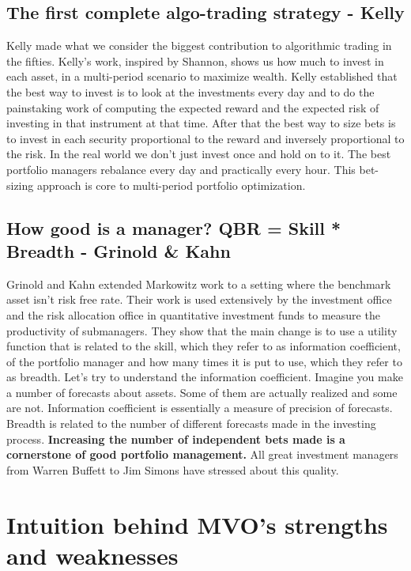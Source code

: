 \documentclass[a4paper]{article}
\begin{document}
\subsection{The first complete algo-trading strategy - Kelly}
Kelly\cite{Kelly90} made what we consider the biggest contribution to algorithmic trading in the fifties. Kelly’s work, inspired by Shannon, shows us how much to invest in each asset, in a multi-period scenario to maximize wealth. Kelly established that the best way to invest is to look at the investments every day and to do the painstaking work of computing the expected reward and the expected risk of investing in that instrument at that time. After that the best way to size bets is to invest in each security proportional to the reward and inversely proportional to the risk. In the real world we don't just invest once and hold on to it. The best portfolio managers rebalance every day and practically every hour. This bet-sizing approach is core to multi-period portfolio optimization. 

\subsection{How good is a manager? QBR = Skill * Breadth - Grinold \& Kahn}
Grinold and Kahn\cite{GK2000} extended Markowitz work to a setting where the benchmark asset isn’t risk free rate. Their work is used extensively by the investment office and the risk allocation office in quantitative investment funds to measure the productivity of submanagers. They show that the main change is to use a utility function that is related to the skill, which they refer to as information coefficient, of the portfolio manager and how many times it is put to use, which they refer to as breadth. Let’s try to understand the information coefficient. Imagine you make a number of forecasts about assets. Some of them are actually realized and some are not. Information coefficient is essentially a measure of precision of forecasts. Breadth is related to the number of different forecasts made in the investing process. \textbf{Increasing the number of independent bets made is a cornerstone of good portfolio management.} All great investment managers from Warren Buffett to Jim Simons have stressed about this quality.

\section{Intuition behind MVO's strengths and weaknesses\label{intuition}}
\end{document}
